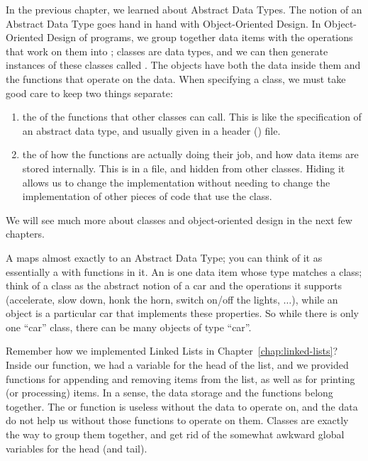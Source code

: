 In the previous chapter, we learned about Abstract Data Types.
The notion of an Abstract Data Type goes hand in hand with
Object-Oriented Design.
In Object-Oriented Design of programs, we group together data items
with the operations that work on them into ;
classes are data types, and we can then generate instances of these
classes called .
The objects have both the data inside them and the
functions that operate on the data.
When specifying a class, we must take good care to keep two things
separate:
\begin{enumerate}
\item the  of the functions that other
classes can call. This is like the specification of an abstract data
type, and usually given in a header () file.
\item the  of how the functions are actually doing
their job, and how data items are stored internally.
This is in a  file, and hidden from other classes.
Hiding it allows us to change the implementation without needing to
change the implementation of other pieces of code that use the class.
\end{enumerate}
We will see much more about classes and object-oriented design in the
next few chapters.

A  maps almost exactly to an Abstract Data Type;
you can think of it as essentially a  with functions in it.
An  is one data item whose type matches a class;
think of a class as the abstract notion of a car and the operations it
supports (accelerate, slow down, honk the horn, switch on/off the
lights, $\ldots$),
while an object is a particular car that implements these properties.
So while there is only one ``car'' class,
there can be many objects of type ``car''.

Remember how we implemented Linked Lists in Chapter~\ref{chap:linked-lists}? 
Inside our  function, we had a variable for the head of the
list, and we provided functions for appending and removing items from
the list, as well as for printing (or processing) items.
In a sense, the data storage and the functions belong together. 
The  or  function is useless without the
data to operate on, and the data do not help us without those
functions to operate on them.
Classes are exactly the way to group them together,
and get rid of the somewhat awkward global variables for the head (and tail).

